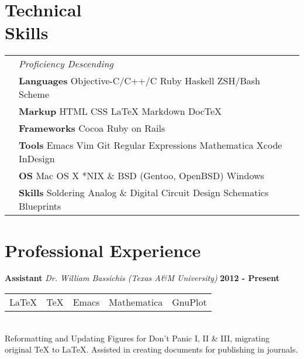 \documentclass[margin,line]{res}
\begin{document}
{\begin{resume}
\vspace*{.15in}
{\color{WildStrawberry}
  \vspace{-.10in}
  \section{\sc Technical \\ Skills}}
\hspace{-.35in}
{\renewcommand{\arraystretch}{1.25}
  \renewcommand{\tabcolsep}{0.175cm}
  \begin{tabular}{l l l}
    & {\em Proficiency Descending} & \\
    & {\bf Languages} Objective-C/C++/C Ruby Haskell ZSH/Bash Scheme \\
    & {\bf Markup} HTML CSS \LaTeX{} Markdown Doc\TeX{}\\
    & {\bf Frameworks} Cocoa  Ruby on Rails \\
    & {\bf Tools} Emacs Vim  Git  Regular Expressions Mathematica
    Xcode InDesign \\
    & {\bf OS} Mac OS X *NIX \& BSD (Gentoo, OpenBSD) Windows \\
    & {\bf Skills} Soldering  Analog \& Digital Circuit Design  Schematics Blueprints\\
  \end{tabular}}


\vspace*{.05in}
{\color{WildStrawberry}
  \section{\sc Professional Experience}}
{\bf Assistant} {\em Dr. William Bassichis (Texas A{\&}M University)} \hfill {\bf 2012 - Present} \
\\
\begin{tabular}{l l l l l}
   \LaTeX{} &  \TeX{} &  Emacs &  Mathematica & GnuPlot
\end{tabular}
\\
Reformatting and Updating Figures for Don't Panic I, II \& III,
migrating \\ original \TeX{} to \LaTeX{}. Assisted in creating
documents for publishing in journals.
\vspace{-.13in}




\end{resume}}
\end{document}

